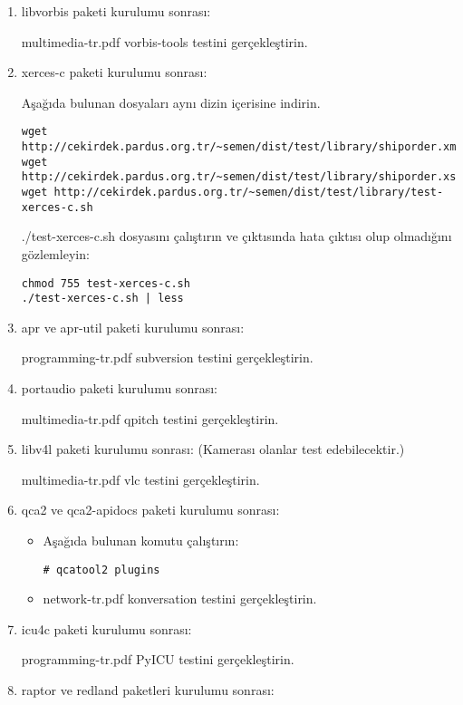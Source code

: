 \documentclass[a4paper,10pt]{article}
\begin{document}
\begin{enumerate}
\item libvorbis paketi kurulumu sonrası:

multimedia-tr.pdf vorbis-tools testini gerçekleştirin.

\item xerces-c paketi kurulumu sonrası:

Aşağıda bulunan dosyaları aynı dizin içerisine indirin.
\begin{verbatim}
wget http://cekirdek.pardus.org.tr/~semen/dist/test/library/shiporder.xml
wget http://cekirdek.pardus.org.tr/~semen/dist/test/library/shiporder.xsd
wget http://cekirdek.pardus.org.tr/~semen/dist/test/library/test-xerces-c.sh
\end{verbatim}

./test-xerces-c.sh dosyasını çalıştırın ve çıktısında hata çıktısı olup olmadığını gözlemleyin:
\begin{verbatim}
chmod 755 test-xerces-c.sh
./test-xerces-c.sh | less
\end{verbatim}

\item apr ve apr-util paketi kurulumu sonrası:

programming-tr.pdf subversion testini gerçekleştirin.

\item portaudio paketi kurulumu sonrası:

multimedia-tr.pdf qpitch testini gerçekleştirin.

\item libv4l paketi kurulumu sonrası: (Kamerası olanlar test edebilecektir.)


multimedia-tr.pdf vlc testini gerçekleştirin.

\item qca2 ve qca2-apidocs paketi kurulumu sonrası:
\begin{itemize}
 \item Aşağıda bulunan komutu çalıştırın:
\begin{verbatim}
# qcatool2 plugins 
\end{verbatim}
\item network-tr.pdf konversation testini gerçekleştirin.
\end{itemize}


\item icu4c paketi kurulumu sonrası:

programming-tr.pdf PyICU testini gerçekleştirin.

\item raptor ve redland paketleri kurulumu sonrası:


\end{enumerate}
\end{document}
